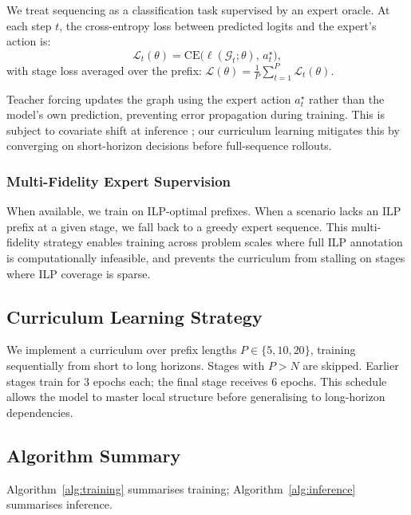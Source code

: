 \documentclass[conference]{IEEEtran}
\begin{document}
We treat sequencing as a classification task supervised by an expert oracle. At each step $t$, the cross-entropy loss between predicted logits and the expert's action is:
\begin{equation}
\mathcal{L}_t(\theta) = \text{CE}\big(\ell(\mathcal{G}_t;\theta),\, a_t^\star\big),
\end{equation}
with stage loss averaged over the prefix: $\mathcal{L}(\theta) = \frac{1}{P}\sum_{t=1}^{P}\mathcal{L}_t(\theta)$.

Teacher forcing updates the graph using the expert action $a_t^\star$ rather than the model's own prediction, preventing error propagation during training. This is subject to covariate shift at inference \cite{ross2011dagger}; our curriculum learning mitigates this by converging on short-horizon decisions before full-sequence rollouts.

\subsubsection{Multi-Fidelity Expert Supervision}
When available, we train on ILP-optimal prefixes. When a scenario lacks an ILP prefix at a given stage, we fall back to a greedy expert sequence. This multi-fidelity strategy enables training across problem scales where full ILP annotation is computationally infeasible, and prevents the curriculum from stalling on stages where ILP coverage is sparse.

\subsection{Curriculum Learning Strategy}

We implement a curriculum over prefix lengths $P \in \{5, 10, 20\}$, training sequentially from short to long horizons. Stages with $P > N$ are skipped. Earlier stages train for 3 epochs each; the final stage receives 6 epochs. This schedule allows the model to master local structure before generalising to long-horizon dependencies.

\subsection{Algorithm Summary}

Algorithm~\ref{alg:training} summarises training; Algorithm~\ref{alg:inference} summarises inference.
\end{document}
